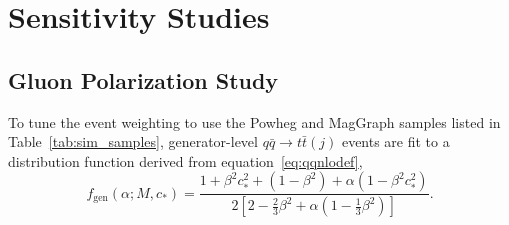 

\section{Sensitivity Studies}
\subsection{Gluon Polarization Study}
To tune the event weighting to use the Powheg and MagGraph samples listed in Table~\ref{tab:sim_samples}, generator-level $q\bar q\to t\bar t(j)$ events are fit to a distribution function derived from equation~\ref{eq:qqnlodef},
\begin{equation}
f_\mathrm{gen}(\alpha;M,c_*) = \frac{1+\beta^2c_*^2+\left(1-\beta^2\right)+\alpha\left(1-\beta^2c_*^2\right)}{2\left[2-\frac{2}{3}\beta^2+\alpha\left(1-\frac{1}{3}\beta^2\right)\right]}. \label{eq:wgt_test}
\end{equation}
